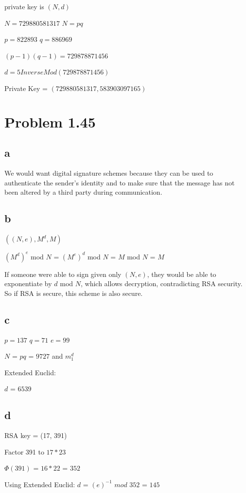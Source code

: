 \documentclass{article}
\begin{document}
\vspace{5mm}

private key is $(N,d)$

$N=729880581317$ $N=pq$ 

$p=822893$ $q=886969$

$(p-1)(q-1)=729878871456$

$d=5InverseMod(729878871456) $

Private Key = $(729880581317, 583903097165)$



\section{Problem 1.45}
\subsection{a}
We would want digital signature schemes because they can be used to authenticate the sender's identity and to make sure that the message has not been altered by a third party during communication.
\subsection{b}
$((N, e), M^{d}, M)$

$(M^{d})^{e}$ mod $N$ = $(M^{e})^{d}$ mod $N$ = $M$ mod $N$ = $M$

\vspace{2mm}

If someone were able to sign given only $(N,e)$, they would be able to exponentiate by $d$ mod $N$, which allows decryption, contradicting RSA security. So if RSA is secure, this scheme is also secure.

\subsection{c}
$p = 137$ $q = 71$ $e = 99$

$N$ = $pq$ = $9727$ and $m_{1}^{d}$

Extended Euclid:

$d$ = $6539$
\subsection{d}
RSA key = (17, 391)

Factor 391 to $17 * 23$

$\Phi(391)$ = $16 * 22$ = $352$

Using Extended Euclid:
$d$ = $(e)^{-1}$ $mod$ $352$ = $145$
\end{document}

